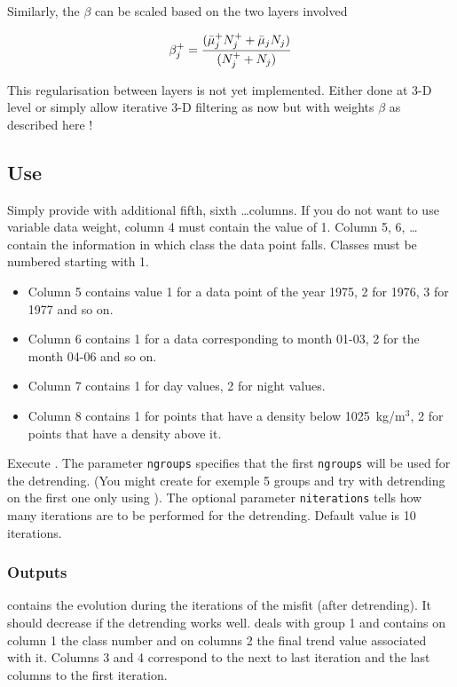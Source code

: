 Similarly, the $ \beta$ can be scaled based on the two layers involved

\begin{equation}
\beta^+_j = { (\bar{\mu}^+_j N_j^+ + \bar{\mu}_j N_j) \over (N_j^++N_j) }
\end{equation}

This regularisation between layers is not yet implemented. Either done at 3-D level or simply allow iterative 3-D filtering as now but with weights $\beta$ as described here !


\subsection{Use}

Simply provide  with additional fifth, sixth \ldots columns. If you do not want to use variable data weight, column 4 must contain the value of 1. Column 5, 6, \ldots contain the information in which class the data point falls. Classes must be numbered starting with 1.

\example
\begin{itemize}
\item
Column 5 contains value 1 for a data point of the year 1975, 2 for 1976, 3 for 1977 and so on.
\item
Column 6 contains 1 for a data corresponding to month 01-03, 2 for the month 04-06 and so on.
\item
Column 7 contains 1 for day values, 2 for night values.
\item
Column 8 contains 1 for points that have a density below 1025~kg/m$^3$, 2 for points that have a density above it.
\end{itemize}

Execute . The parameter {\tt ngroups} specifies that the first {\tt ngroups} will be used for the detrending.
(You might create for exemple 5 groups and try with detrending on the first one only using ). The optional parameter {\tt niterations} tells how many iterations are to be performed for the detrending. Default value is 10 iterations.

\subsubsection{Outputs}
 contains the evolution during the iterations of the misfit (after detrending). It should decrease if the detrending works well.   deals with group 1 and contains on column 1 the class number and on columns 2 the final trend value associated with it. Columns 3 and 4 correspond to the next to last iteration and the last columns to the first iteration.

